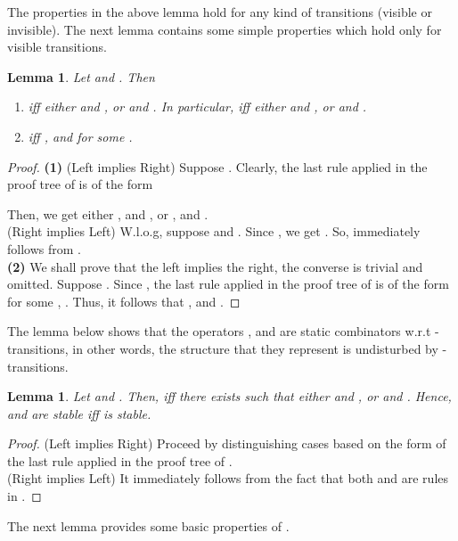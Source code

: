 \documentclass{elsarticle}
\theoremstyle{plain}
\newtheorem{lemma}[theorem]{Lemma}
\theoremstyle{definition}
\begin{document}
The properties in the above lemma hold for any kind of transitions (visible or invisible). The next lemma contains some simple properties which hold only for visible transitions.

\begin{lemma}\label{L:Basic_II}
Let  and . Then
    \begin{enumerate}
      \item   iff  either  and , or  and .
          In particular,  iff  either  and , or  and .
      \item  iff ,  and  for some .
    \end{enumerate}
\end{lemma}
\begin{proof}
  \noindent \textbf{(1)} (Left implies Right) Suppose .
  Clearly, the last rule applied in the proof tree of   is of the form
  
  Then, we get either ,  and , or ,  and .\\

  \noindent (Right implies Left) W.l.o.g, suppose  and .
  Since , we get .
  So,  immediately follows from .\\

  \noindent \textbf{(2)} We shall prove that the left implies the right, the converse is trivial and omitted.
   Suppose .
   Since , the last rule applied in the proof tree of  is of the form  for some , .
   Thus, it follows that ,  and .
\end{proof}

The lemma below shows that the operators ,  and  are static combinators w.r.t -transitions, in other words, the structure that they represent is undisturbed by -transitions.


\begin{lemma}\label{L:STABILIZATION}
Let  and .
Then,  iff there exists  such that either  and , or  and .
Hence,  and  are stable iff  is stable.
\end{lemma}
\begin{proof}
(Left implies Right) Proceed by distinguishing cases based on the form of the last rule applied in the proof tree of .\\

\noindent (Right implies Left) It immediately follows from the fact that both  and  are rules in .
\end{proof}

The next lemma provides some basic properties of .
\end{document}
